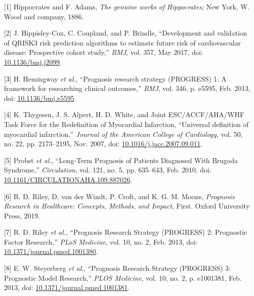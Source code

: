 \documentclass[
]{article}
\newenvironment{cslreferences}%
  {}%
  {\par}
\begin{document}
\hypertarget{refs}{}
\begin{cslreferences}
\leavevmode\hypertarget{ref-hippocrates_genuine_1886}{}%
{[}1{]} Hippocrates and F. Adams, \emph{The genuine works of Hippocrates;} New York, W. Wood and company, 1886.

\leavevmode\hypertarget{ref-hippisley-cox_development_2017}{}%
{[}2{]} J. Hippisley-Cox, C. Coupland, and P. Brindle, ``Development and validation of QRISK3 risk prediction algorithms to estimate future risk of cardiovascular disease: Prospective cohort study,'' \emph{BMJ}, vol. 357, May 2017, doi: \href{https://doi.org/10.1136/bmj.j2099}{10.1136/bmj.j2099}.

\leavevmode\hypertarget{ref-hemingway_prognosis_2013}{}%
{[}3{]} H. Hemingway \emph{et al.}, ``Prognosis research strategy (PROGRESS) 1: A framework for researching clinical outcomes,'' \emph{BMJ}, vol. 346, p. e5595, Feb. 2013, doi: \href{https://doi.org/10.1136/bmj.e5595}{10.1136/bmj.e5595}.

\leavevmode\hypertarget{ref-thygesen_universal_2007}{}%
{[}4{]} K. Thygesen, J. S. Alpert, H. D. White, and Joint ESC/ACCF/AHA/WHF Task Force for the Redefinition of Myocardial Infarction, ``Universal definition of myocardial infarction,'' \emph{Journal of the American College of Cardiology}, vol. 50, no. 22, pp. 2173--2195, Nov. 2007, doi: \href{https://doi.org/10.1016/j.jacc.2007.09.011}{10.1016/j.jacc.2007.09.011}.

\leavevmode\hypertarget{ref-probst_long-term_2010}{}%
{[}5{]} Probst \emph{et al.}, ``Long-Term Prognosis of Patients Diagnosed With Brugada Syndrome,'' \emph{Circulation}, vol. 121, no. 5, pp. 635--643, Feb. 2010, doi: \href{https://doi.org/10.1161/CIRCULATIONAHA.109.887026}{10.1161/CIRCULATIONAHA.109.887026}.

\leavevmode\hypertarget{ref-riley_prognosis_2019}{}%
{[}6{]} R. D. Riley, D. van der Windt, P. Croft, and K. G. M. Moons, \emph{Prognosis Research in Healthcare: Concepts, Methods, and Impact}, First. Oxford University Press, 2019.

\leavevmode\hypertarget{ref-riley_prognosis_2013}{}%
{[}7{]} R. D. Riley \emph{et al.}, ``Prognosis Research Strategy (PROGRESS) 2: Prognostic Factor Research,'' \emph{PLoS Medicine}, vol. 10, no. 2, Feb. 2013, doi: \href{https://doi.org/10.1371/journal.pmed.1001380}{10.1371/journal.pmed.1001380}.

\leavevmode\hypertarget{ref-steyerberg_prognosis_2013}{}%
{[}8{]} E. W. Steyerberg \emph{et al.}, ``Prognosis Research Strategy (PROGRESS) 3: Prognostic Model Research,'' \emph{PLOS Medicine}, vol. 10, no. 2, p. e1001381, Feb. 2013, doi: \href{https://doi.org/10.1371/journal.pmed.1001381}{10.1371/journal.pmed.1001381}.


\end{cslreferences}
\end{document}
